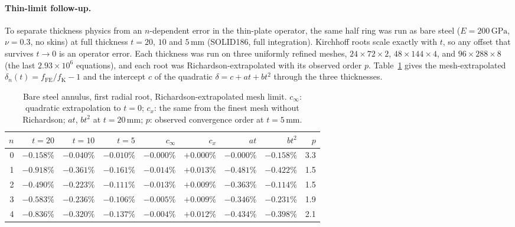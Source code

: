 \documentclass[11pt]{article}
\begin{document}
\paragraph{Thin-limit follow-up.} To separate thickness physics from an
$n$-dependent error in the thin-plate operator, the same half ring was
run as bare steel ($E=200\,\mathrm{GPa}$, $\nu=0.3$, no skins) at full
thickness $t=20$, $10$ and $5\,\mathrm{mm}$ (SOLID186, full
integration). Kirchhoff roots scale exactly with $t$, so any offset that
survives $t\to0$ is an operator error. Each thickness was run on three
uniformly refined meshes, $24\times72\times2$, $48\times144\times4$, and
$96\times288\times8$ (the last $2.93\times10^{6}$ equations), and each
root was Richardson-extrapolated with its observed order $p$.
Table~\ref{tab:s9thin} gives the mesh-extrapolated
$\delta_n(t)=f_{\mathrm{FE}}/f_{\mathrm{K}}-1$ and the intercept $c$ of
the quadratic $\delta=c+at+bt^2$ through the three thicknesses.

\begin{table}[ht]
\centering
\caption{Bare steel annulus, first radial root, Richardson-extrapolated
mesh limit. $c_\infty$: quadratic extrapolation to $t=0$; $c_x$: the same
from the finest mesh without Richardson; $at$, $bt^2$ at
$t=20\,\mathrm{mm}$; $p$: observed convergence order at
$t=5\,\mathrm{mm}$.}
\label{tab:s9thin}
\small
\begin{tabular}{@{}rrrrrrrrr@{}}
\toprule
$n$ & $t=20$ & $t=10$ & $t=5$ & $c_\infty$ & $c_x$ & $at$ & $bt^2$ & $p$ \\
\midrule
0 & $-0.158\%$ & $-0.040\%$ & $-0.010\%$ & $-0.000\%$ & $+0.000\%$ & $-0.000\%$ & $-0.158\%$ & 3.3 \\
1 & $-0.918\%$ & $-0.361\%$ & $-0.161\%$ & $-0.014\%$ & $+0.013\%$ & $-0.481\%$ & $-0.422\%$ & 1.5 \\
2 & $-0.490\%$ & $-0.223\%$ & $-0.111\%$ & $-0.013\%$ & $+0.009\%$ & $-0.363\%$ & $-0.114\%$ & 1.5 \\
3 & $-0.583\%$ & $-0.236\%$ & $-0.106\%$ & $-0.005\%$ & $+0.009\%$ & $-0.346\%$ & $-0.231\%$ & 1.9 \\
4 & $-0.836\%$ & $-0.320\%$ & $-0.137\%$ & $-0.004\%$ & $+0.012\%$ & $-0.434\%$ & $-0.398\%$ & 2.1 \\
\bottomrule
\end{tabular}
\end{table}
\end{document}
